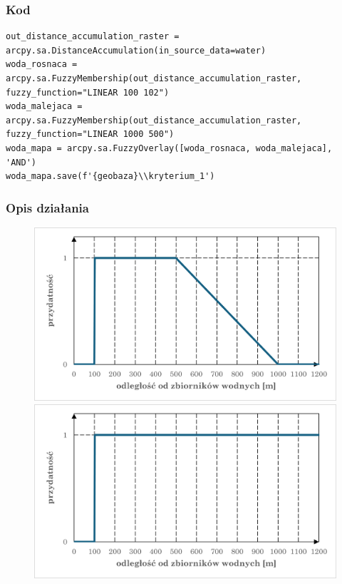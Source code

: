 \documentclass{article}
\begin{document}
\subsubsection{Kod}
\begin{lstlisting}
out_distance_accumulation_raster = arcpy.sa.DistanceAccumulation(in_source_data=water)
woda_rosnaca = arcpy.sa.FuzzyMembership(out_distance_accumulation_raster, fuzzy_function="LINEAR 100 102")
woda_malejaca = arcpy.sa.FuzzyMembership(out_distance_accumulation_raster, fuzzy_function="LINEAR 1000 500")
woda_mapa = arcpy.sa.FuzzyOverlay([woda_rosnaca, woda_malejaca], 'AND')
woda_mapa.save(f'{geobaza}\\kryterium_1')
\end{lstlisting}

\subsubsection{Opis działania}

\begin{figure}[H]
    \centering
    \begin{minipage}{0.48\textwidth}
        \centering
        \includegraphics[width=\linewidth]{img/kryterium1-wykres-pierwszy.png}
        \caption*{}
    \end{minipage}
    \begin{minipage}{0.48\textwidth}
        \centering
        \includegraphics[width=\linewidth]{img/kryterium1-wykres-drugi.png}
        \caption*{}
    \end{minipage}
\end{figure}
\end{document}
